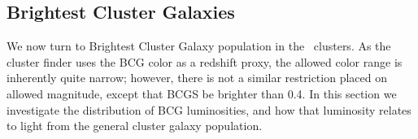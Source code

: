 \documentclass{emulateapj}
\begin{document}









\begin{figure}
\end{figure} 




\subsection{Brightest Cluster Galaxies}\label{sec:BCGs}
We now turn to Brightest Cluster Galaxy population in the \maxbcg\ 
clusters.  As the cluster finder uses the BCG color as a redshift
proxy, the allowed color range is inherently quite narrow; however,
there is not a similar restriction placed on allowed magnitude, except
that BCGS be brighter than 0.4\Lstar. In this section we investigate the
distribution of BCG luminosities, and how that luminosity relates to
light from the general cluster galaxy population.
\end{document}
